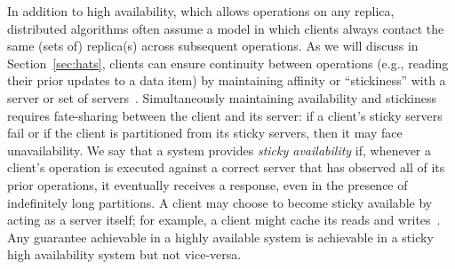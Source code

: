 In addition to high availability, which allows operations on any replica,
distributed algorithms often assume a model in which clients always
contact the same (sets of) replica(s) across subsequent operations. As
we will discuss in Section~\ref{sec:hats}, clients can ensure
continuity between operations (e.g., reading their prior updates to a
data item) by maintaining affinity or ``stickiness'' with a server or
set of servers~\cite{vogels-defs}. Simultaneously maintaining
availability and stickiness requires fate-sharing between the client
and its server: if a client's sticky servers fail or if the client is
partitioned from its sticky servers, then it may face
unavailability. We say that a system provides \textit{sticky
  availability} if, whenever a client's operation is executed against
a correct server that has observed all of its prior operations, it
eventually receives a response, even in the presence of indefinitely
long partitions. A client may choose to become sticky available by
acting as a server itself; for example, a client might cache its reads
and writes~\cite{bolton, sessionguarantees, swift}. Any guarantee
achievable in a highly available system is achievable in a sticky high
availability system but not vice-versa.




